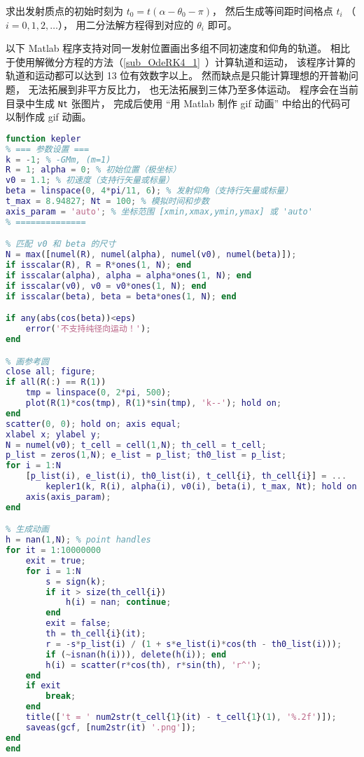 求出发射质点的初始时刻为 $t_0 = t(\alpha - \theta_0 - \pi)$， 然后生成等间距时间格点 $t_i$ （$i=0,1,2,\dots$）， 用二分法解方程得到对应的 $\theta_i$ 即可。

以下 Matlab 程序支持对同一发射位置画出多组不同初速度和仰角的轨道。 相比于使用解微分方程的方法（\autoref{sub_OdeRK4_1}~）计算轨道和运动， 该程序计算的轨道和运动都可以达到 13 位有效数字以上。 然而缺点是只能计算理想的开普勒问题， 无法拓展到非平方反比力， 也无法拓展到三体乃至多体运动。 程序会在当前目录中生成 \verb|Nt| 张图片， 完成后使用 “用 Matlab 制作 gif 动画” 中给出的代码可以制作成 gif 动画。

\begin{lstlisting}[language=matlab,caption=kepler.m]
% 已知初始位置、发射速度、发射方向， 求轨道以及运动方程
function kepler
% === 参数设置 ===
k = -1; % -GMm, (m=1)
R = 1; alpha = 0; % 初始位置（极坐标）
v0 = 1.1; % 初速度（支持行矢量或标量）
beta = linspace(0, 4*pi/11, 6); % 发射仰角（支持行矢量或标量）
t_max = 8.94827; Nt = 100; % 模拟时间和步数
axis_param = 'auto'; % 坐标范围 [xmin,xmax,ymin,ymax] 或 'auto'
% ==============

% 匹配 v0 和 beta 的尺寸
N = max([numel(R), numel(alpha), numel(v0), numel(beta)]);
if isscalar(R), R = R*ones(1, N); end
if isscalar(alpha), alpha = alpha*ones(1, N); end
if isscalar(v0), v0 = v0*ones(1, N); end
if isscalar(beta), beta = beta*ones(1, N); end

if any(abs(cos(beta))<eps)
    error('不支持纯径向运动！');
end

% 画参考圆
close all; figure;
if all(R(:) == R(1))
    tmp = linspace(0, 2*pi, 500);
    plot(R(1)*cos(tmp), R(1)*sin(tmp), 'k--'); hold on;
end
scatter(0, 0); hold on; axis equal;
xlabel x; ylabel y;
N = numel(v0); t_cell = cell(1,N); th_cell = t_cell;
p_list = zeros(1,N); e_list = p_list; th0_list = p_list;
for i = 1:N
    [p_list(i), e_list(i), th0_list(i), t_cell{i}, th_cell{i}] = ...
        kepler1(k, R(i), alpha(i), v0(i), beta(i), t_max, Nt); hold on;
    axis(axis_param);
end

% 生成动画
h = nan(1,N); % point handles
for it = 1:10000000
    exit = true;
    for i = 1:N
        s = sign(k);
        if it > size(th_cell{i})
            h(i) = nan; continue;
        end
        exit = false;
        th = th_cell{i}(it);
        r = -s*p_list(i) / (1 + s*e_list(i)*cos(th - th0_list(i)));
        if (~isnan(h(i))), delete(h(i)); end
        h(i) = scatter(r*cos(th), r*sin(th), 'r^');
    end
    if exit
        break;
    end
    title(['t = ' num2str(t_cell{1}(it) - t_cell{1}(1), '%.2f')]);
    saveas(gcf, [num2str(it) '.png']);
end
end


\end{lstlisting}
